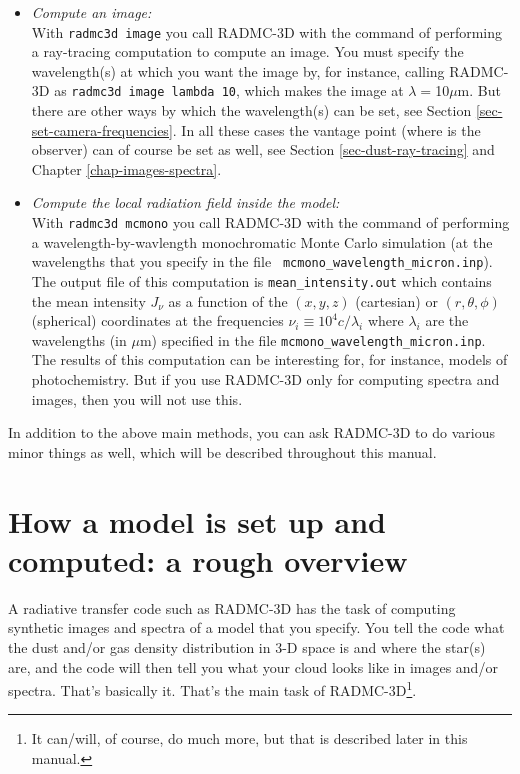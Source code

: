 \documentclass{report}
\begin{document}
\begin{itemize}
\item {\em Compute an image:}\\
  With {\small\tt radmc3d image} you call RADMC-3D with the command of
  performing a ray-tracing computation to compute an image. You must specify
  the wavelength(s) at which you want the image by, for instance, calling
  RADMC-3D as {\small\tt radmc3d image lambda 10}, which makes the image at
  $\lambda=$10$\mu$m. But there are other ways by which the wavelength(s)
  can be set, see Section \ref{sec-set-camera-frequencies}.  In all these
  cases the vantage point (where is the observer) can of course be set as
  well, see Section \ref{sec-dust-ray-tracing} and Chapter
  \ref{chap-images-spectra}.
\item {\em Compute the local radiation field inside the model:}\\
  With {\small\tt radmc3d mcmono} you call RADMC-3D with the command of
  performing a wavelength-by-wavlength monochromatic Monte Carlo simulation
  (at the wavelengths that you specify in the file {\small\tt
    mcmono\_wavelength\_micron.inp}). The output file of this computation is
  {\small\tt mean\_intensity.out} which contains the mean intensity $J_\nu$
  as a function of the $(x,y,z)$ (cartesian) or $(r,\theta,\phi)$
  (spherical) coordinates at the frequencies $\nu_i\equiv 10^4c/\lambda_i$
  where $\lambda_i$ are the wavelengths (in $\mu$m) specified in the file
  {\small\tt mcmono\_wavelength\_micron.inp}. The results of this
  computation can be interesting for, for instance, models of
  photochemistry. But if you use RADMC-3D only for computing spectra and
  images, then you will not use this.
\end{itemize}
In addition to the above main methods, you can ask RADMC-3D to do various
minor things as well, which will be described throughout this manual.



\section{How a model is set up and computed: a rough overview}
A radiative transfer code such as RADMC-3D has the task of computing
synthetic images and spectra of a model that you specify. You tell the code
what the dust and/or gas density distribution in 3-D space is and where the
star(s) are, and the code will then tell you what your cloud looks like in
images and/or spectra. That's basically it. That's the main task of
RADMC-3D\footnote{It can/will, of course, do much more, but that is
described later in this manual.}.
\end{document}

